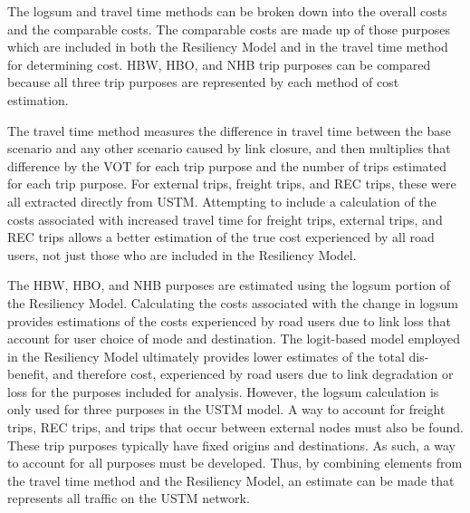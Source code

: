 The logsum and travel time methods can be broken down into the overall costs and the
comparable costs. The comparable costs are made up of those purposes which are
included in both the Resiliency Model and in the travel time method for determining
cost. HBW, HBO, and NHB trip purposes can be compared because all three trip purposes
are represented by each method of cost estimation.

The travel time method measures the difference in travel time between the base
scenario and any other scenario caused by link closure, and then multiplies that
difference by the VOT for each trip purpose and the number of trips estimated for
each trip purpose. For external trips, freight trips, and REC trips, these were all
extracted directly from USTM. Attempting to include a calculation of the costs
associated with increased travel time for freight trips, external trips, and REC
trips allows a better estimation of the true cost experienced by all road users, not
just those who are included in the Resiliency Model.

The HBW, HBO, and NHB purposes are estimated using the logsum portion of the
Resiliency Model. Calculating the costs associated with the change in logsum
provides estimations of the costs experienced by road users due to link loss
that account for user choice of mode and destination. The logit-based model
employed in the Resiliency Model ultimately provides lower estimates of the
total dis-benefit, and therefore cost, experienced by road users due to link
degradation or loss for the purposes included for analysis. However, the
logsum calculation is only used for three purposes in the USTM model. A way to
account for freight trips, REC trips, and trips that occur between external
nodes must also be found. These trip purposes typically have fixed origins
and destinations. As such, a way to account for all purposes must be developed.
Thus, by combining elements from the travel time method and the Resiliency
Model, an estimate can be made that represents all traffic on the USTM network.

